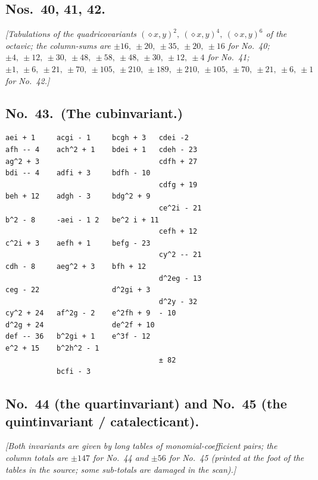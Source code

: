 \documentclass[11pt]{article}
\begin{document}
\subsection*{Nos.\ 40, 41, 42.}

\textit{[Tabulations of the quadricovariants $(\diamond x,y)^2,\ (\diamond x,y)^4,\ (\diamond x,y)^6$ of the octavic; the column-sums are $\pm 16,\ \pm 20,\ \pm 35,\ \pm 20,\ \pm 16$ for No.\ 40; $\pm 4,\ \pm 12,\ \pm 30,\ \pm 48,\ \pm 58,\ \pm 48,\ \pm 30,\ \pm 12,\ \pm 4$ for No.\ 41; $\pm 1,\ \pm 6,\ \pm 21,\ \pm 70,\ \pm 105,\ \pm 210,\ \pm 189,\ \pm 210,\ \pm 105,\ \pm 70,\ \pm 21,\ \pm 6,\ \pm 1$ for No.\ 42.]}

\subsection*{No.\ 43.\ (The cubinvariant.)}

\smallskip

\begin{small}
\begin{verbatim}
aei + 1     acgi - 1     bcgh + 3   cdei -2
afh -- 4    ach^2 + 1    bdei + 1   cdeh - 23
ag^2 + 3                            cdfh + 27
bdi -- 4    adfi + 3     bdfh - 10
                                    cdfg + 19
beh + 12    adgh - 3     bdg^2 + 9
                                    ce^2i - 21
b^2 - 8     -aei - 1 2   be^2 i + 11
                                    cefh + 12
c^2i + 3    aefh + 1     befg - 23
                                    cy^2 -- 21
cdh - 8     aeg^2 + 3    bfh + 12
                                    d^2eg - 13
ceg - 22                 d^2gi + 3
                                    d^2y - 32
cy^2 + 24   af^2g - 2    e^2fh + 9  - 10
d^2g + 24                de^2f + 10
def -- 36   b^2gi + 1    e^3f - 12
e^2 + 15    b^2h^2 - 1
                                    ± 82
            bcfi - 3
\end{verbatim}
\end{small}

\subsection*{No.\ 44 (the quartinvariant) and No.\ 45 (the quintinvariant / catalecticant).}

\textit{[Both invariants are given by long tables of monomial-coefficient pairs; the column totals are $\pm 147$ for No.\ 44 and $\pm 56$ for No.\ 45 (printed at the foot of the tables in the source; some sub-totals are damaged in the scan).]}
\end{document}
